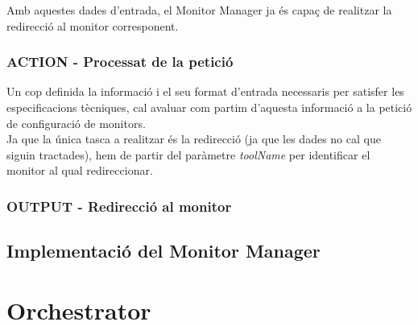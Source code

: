 Amb aquestes dades d'entrada, el Monitor Manager ja és capaç de realitzar la redirecció al monitor corresponent.

\subsubsection{ACTION - Processat de la petició}

Un cop definida la informació i el seu format d'entrada necessaris per satisfer les especificacions tècniques, cal avaluar com partim d'aquesta informació a la petició de configuració de monitors.\\

Ja que la única tasca a realitzar és la redirecció (ja que les dades no cal que siguin tractades), hem de partir del paràmetre \textit{toolName} per identificar el monitor al qual redireccionar. 

\subsubsection{OUTPUT - Redirecció al monitor}

\subsection{Implementació del Monitor Manager}



\section{Orchestrator}
